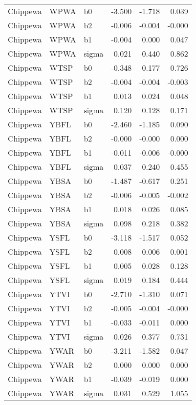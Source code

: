 \begin{table}[ht]
\begin{center}
\begin{tabular}{lllrrr}
  Chippewa & WPWA & b0 & -3.500 & -1.718 & 0.039 \\ 
  Chippewa & WPWA & b2 & -0.006 & -0.004 & -0.000 \\ 
  Chippewa & WPWA & b1 & -0.004 & 0.000 & 0.047 \\ 
  Chippewa & WPWA & sigma & 0.021 & 0.440 & 0.862 \\ 
  Chippewa & WTSP & b0 & -0.348 & 0.177 & 0.726 \\ 
  Chippewa & WTSP & b2 & -0.004 & -0.004 & -0.003 \\ 
  Chippewa & WTSP & b1 & 0.013 & 0.024 & 0.048 \\ 
  Chippewa & WTSP & sigma & 0.120 & 0.128 & 0.171 \\ 
  Chippewa & YBFL & b0 & -2.460 & -1.185 & 0.090 \\ 
  Chippewa & YBFL & b2 & -0.000 & -0.000 & 0.000 \\ 
  Chippewa & YBFL & b1 & -0.011 & -0.006 & -0.000 \\ 
  Chippewa & YBFL & sigma & 0.037 & 0.240 & 0.455 \\ 
  Chippewa & YBSA & b0 & -1.487 & -0.617 & 0.251 \\ 
  Chippewa & YBSA & b2 & -0.006 & -0.005 & -0.002 \\ 
  Chippewa & YBSA & b1 & 0.018 & 0.026 & 0.085 \\ 
  Chippewa & YBSA & sigma & 0.098 & 0.218 & 0.382 \\ 
  Chippewa & YSFL & b0 & -3.118 & -1.517 & 0.052 \\ 
  Chippewa & YSFL & b2 & -0.008 & -0.006 & -0.001 \\ 
  Chippewa & YSFL & b1 & 0.005 & 0.028 & 0.128 \\ 
  Chippewa & YSFL & sigma & 0.019 & 0.184 & 0.444 \\ 
  Chippewa & YTVI & b0 & -2.710 & -1.310 & 0.071 \\ 
  Chippewa & YTVI & b2 & -0.005 & -0.004 & -0.000 \\ 
  Chippewa & YTVI & b1 & -0.033 & -0.011 & 0.000 \\ 
  Chippewa & YTVI & sigma & 0.026 & 0.377 & 0.731 \\ 
  Chippewa & YWAR & b0 & -3.211 & -1.582 & 0.047 \\ 
  Chippewa & YWAR & b2 & 0.000 & 0.000 & 0.000 \\ 
  Chippewa & YWAR & b1 & -0.039 & -0.019 & 0.000 \\ 
  Chippewa & YWAR & sigma & 0.031 & 0.529 & 1.055 \\ 

\end{tabular}
\end{center}
\end{table}
